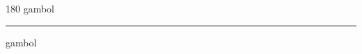 
\begin{frame}
\begin{center}
\begin{turn}{180}
{\fontsize{2.5cm}{1em}\selectfont gambol}
\end{turn}
\vspace{1em}\par  
\hrule
\vspace{1em}\par  
{\fontsize{2.5cm}{1em}\selectfont gambol}
\end{center}
\end{frame}
